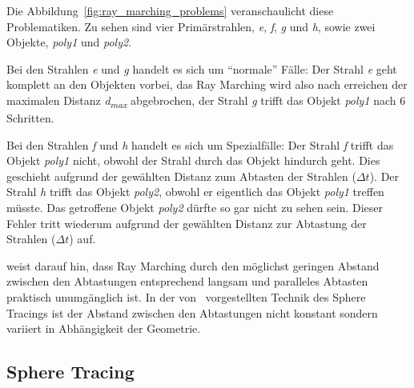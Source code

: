 Die Abbildung~\ref{fig:ray_marching_problems} veranschaulicht diese
Problematiken. Zu sehen sind vier Primärstrahlen, \textit{e},
\textit{f}, \textit{g} und \textit{h},  sowie zwei Objekte,
\textit{poly1} und \textit{poly2}.

Bei den Strahlen \textit{e} und \textit{g} handelt es sich um
``normale'' Fälle: Der Strahl \textit{e} geht komplett an den Objekten
vorbei, das Ray Marching wird also nach erreichen der maximalen Distanz
\textit{d\textsubscript{max}} abgebrochen, der Strahl \textit{g} trifft
das Objekt \textit{poly1} nach 6 Schritten.

Bei den Strahlen \textit{f} und \textit{h} handelt es sich um
Spezialfälle: Der Strahl \textit{f} trifft das Objekt \textit{poly1}
nicht, obwohl der Strahl durch das Objekt hindurch geht. Dies geschieht
aufgrund der gewählten Distanz zum Abtasten der Strahlen ($\Delta t$).
Der Strahl \textit{h} trifft das Objekt \textit{poly2}, obwohl er
eigentlich das Objekt \textit{poly1} treffen müsste. Das getroffene
Objekt \textit{poly2} dürfte so gar nicht zu sehen sein. Dieser Fehler
tritt wiederum aufgrund der gewählten Distanz zur Abtastung der Strahlen
($\Delta t$) auf.

\cite{hart_sphere_1994} weist darauf hin, dass Ray Marching durch den möglichst
geringen Abstand zwischen den Abtastungen entsprechend langsam und paralleles
Abtasten praktisch unumgänglich ist. In der von~\cite{hart_sphere_1994}
vorgestellten Technik des Sphere Tracings ist der Abstand zwischen den
Abtastungen nicht konstant sondern variiert in Abhängigkeit der Geometrie.

\subsection{Sphere Tracing}
\label{subsec:sphere_tracing}

